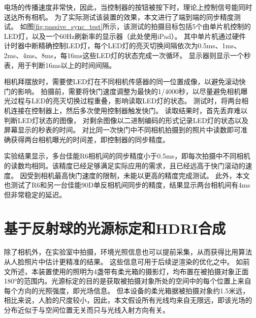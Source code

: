 电场的传播速度非常快，因此，当控制器的按钮被按下时，理论上控制信号能同时送达所有相机。
为了实际测试该装置的效果，本文进行了端到端的同步精度测试。
如图\ref{fig:passive_sync_test}所示，该测试的拍摄目标包括5个由单片机控制的LED灯，以及一个60Hz刷新率的显示器（此处使用iPad）。
其中单片机通过硬件计时器中断精确控制LED灯，每个LED灯的亮灭切换间隔依次为0.5ms、1ms、2ms、4ms、8ms，每16ms这些LED灯的状态完成一次循环。
显示器则显示一个秒表，用于判断16ms以上的时间间隔。

相机拜摆放时，需要使LED灯在不同相机传感器的同一位置成像，以避免滚动快门的影响。
拍摄前，需要将快门速度调整为最快的1/4000秒，以尽量避免相机曝光过程与LED的亮灭切换过程重叠，影响读取LED灯的状态。
测试时，将两台相机连接在控制器上，然后多次使用控制器触发快门。
读取结果时，首先丢弃难以判断LED灯状态的图像，
对剩余图像以二进制编码的形式记录LED灯的状态以及屏幕显示的秒表的时间。
对比同一次快门中不同相机拍摄到的照片中读数即可准确获得两台相机曝光的时间差，即控制器的同步精度。

实验结果显示，多台佳能R6相机间的同步精度小于0.5ms，即每次拍摄中不同相机的读数均相同。该精度已经足够满足实际应用的需求，且已经远高于快门滚动的速度。
因受到相机最高快门速度的限制，未能以更高的精度完成测试。
此外，本文也测试了R6和另一台佳能90D单反相机间同步的精度，结果显示两台相机间有4ms但非常稳定的延迟。



\section{基于反射球的光源标定和HDRI合成}
\label{sec:light_calib}

除了相机外，在实验室中拍摄，环境光照信息也可以提前采集，从而获得比用算法从人脸照片中估计更精准的结果。
这些信息可用于后续逆渲染的优化之中。
如前文所述，本装置使用的照明为4盏带有柔光箱的摄影灯，均布置在被拍摄对象正面180°的范围内。光源标定的目的是获取被拍摄对象所处的空间中的每个位置上来自每个方向的光照强度，即光场信息。
但本设备的柔光箱据被拍摄对象约1.5米远，相比来说，人脸的尺度较小，因此，本文假设所有光线均来自无限远，即该光场的分布近似于与空间位置无关而只与光线入射方向有关。


